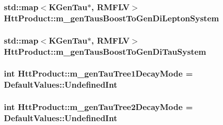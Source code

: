 \label{classHttProduct_a48cfa5c2f5cf0b2909858ac0dfc3badc}
\hypertarget{classHttProduct_aad0006f795c69ebf4010459418693721}{
\subsubsection[{m\_\-genTausBoostToGenDiLeptonSystem}]{\setlength{\rightskip}{0pt plus 5cm}std::map$<$KGenTau$\ast$, RMFLV$>$ {\bf HttProduct::m\_\-genTausBoostToGenDiLeptonSystem}}}
\label{classHttProduct_aad0006f795c69ebf4010459418693721}
\hypertarget{classHttProduct_ac04d1f87583b1228a755735133e53bf6}{
\subsubsection[{m\_\-genTausBoostToGenDiTauSystem}]{\setlength{\rightskip}{0pt plus 5cm}std::map$<$KGenTau$\ast$, RMFLV$>$ {\bf HttProduct::m\_\-genTausBoostToGenDiTauSystem}}}
\label{classHttProduct_ac04d1f87583b1228a755735133e53bf6}
\hypertarget{classHttProduct_af53a9d1e5cee3afcb40adc1640836c4d}{
\subsubsection[{m\_\-genTauTree1DecayMode}]{\setlength{\rightskip}{0pt plus 5cm}int {\bf HttProduct::m\_\-genTauTree1DecayMode} = DefaultValues::UndefinedInt}}
\label{classHttProduct_af53a9d1e5cee3afcb40adc1640836c4d}
\hypertarget{classHttProduct_a97d011daac22c9d02478a6b11e660193}{
\subsubsection[{m\_\-genTauTree2DecayMode}]{\setlength{\rightskip}{0pt plus 5cm}int {\bf HttProduct::m\_\-genTauTree2DecayMode} = DefaultValues::UndefinedInt}}
\label{classHttProduct_a97d011daac22c9d02478a6b11e660193}
